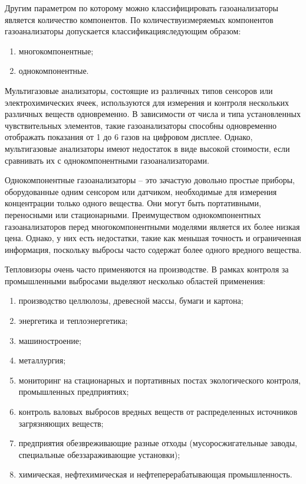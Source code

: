 \documentclass[14pt, a4paper]{extreport}
\begin{document}
	Другим параметром по которому можно классифицировать газоанализаторы является количество компонентов. По количеству\linebreak измеряемых компонентов газоанализаторы допускается классификация\linebreak следующим образом:
	\begin{enumerate}[label={\arabic*)}]
		\item многокомпонентные;
		\item однокомпонентные.
	\end{enumerate}
	
	Мультигазовые анализаторы, состоящие из различных типов сенсоров или электрохимических ячеек, используются для измерения и контроля нескольких различных веществ одновременно. В зависимости от числа и типа установленных чувствительных элементов, такие газоанализаторы способны одновременно отображать показания от 1 до 6 газов на цифровом дисплее. Однако, мультигазовые анализаторы имеют недостаток в виде высокой стоимости, если сравнивать их с однокомпонентными газоанализаторами.
	
	Однокомпонентные газоанализаторы -- это зачастую довольно простые приборы, оборудованные одним сенсором или датчиком, необходимые для измерения концентрации только одного вещества. Они могут быть портативными, переносными или стационарными. Преимуществом однокомпонентных газоанализаторов перед многокомпонентными моделями является их более низкая цена. Однако, у них есть недостатки, такие как меньшая точность и ограниченная информация, поскольку выбросы часто содержат более одного вредного вещества.
	
	Тепловизоры очень часто применяются на производстве. В рамках контроля за промышленными выбросами выделяют несколько областей применения:
	\begin{enumerate}[label={\arabic*)}]
		\item производство целлюлозы, древесной массы, бумаги и картона;
		\item энергетика и теплоэнергетика;
		\item машиностроение;
		\item металлургия;
		\item мониторинг на стационарных и портативных постах экологического контроля, промышленных предприятиях;
		\item контроль валовых выбросов вредных веществ от распределенных источников загрязняющих веществ;
		\item предприятия обезвреживающие разные отходы (мусоросжигательные заводы, специальные обеззараживающие установки);
		\item химическая, нефтехимическая и нефтеперерабатывающая промышленность.
	\end{enumerate}
	
\end{document}
